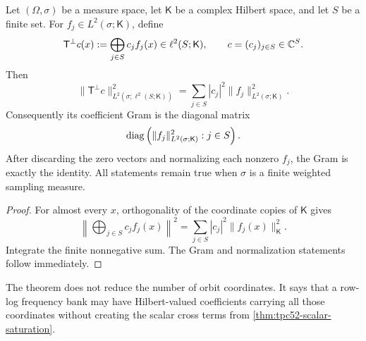\begin{theorem}
\label{thm:tpc52-orthogonal-lift}
Let \((\Omega,\sigma)\) be a measure space, let \(\mathsf K\) be a
complex Hilbert space, and let \(S\) be a finite set.  For
\(f_j\in L^2(\sigma;\mathsf K)\), define
\begin{equation}
 \mathsf T^\perp c(x)
 :=\bigoplus_{j\in S}c_jf_j(x)
 \in\ell^2(S;\mathsf K),
 \qquad c=(c_j)_{j\in S}\in\mathbb C^S.
 \label{eq:tpc52-orthogonal-lift-operator}
\end{equation}
Then
\begin{equation}
 \|\mathsf T^\perp c\|_{L^2(\sigma;\ell^2(S;\mathsf K))}^2
 =\sum_{j\in S}|c_j|^2
   \|f_j\|_{L^2(\sigma;\mathsf K)}^2.
 \label{eq:tpc52-orthogonal-lift-identity}
\end{equation}
Consequently its coefficient Gram is the diagonal matrix
\begin{equation}
 \operatorname{diag}\left(\|f_j\|_{L^2(\sigma;\mathsf K)}^2:j\in S\right).
 \label{eq:tpc52-orthogonal-lift-Gram}
\end{equation}
After discarding the zero vectors and normalizing each nonzero
\(f_j\), the Gram is exactly the identity.  All statements remain true
when \(\sigma\) is a finite weighted sampling measure.
\end{theorem}

\begin{proof}
For almost every \(x\), orthogonality of the coordinate copies of
\(\mathsf K\) gives
\begin{equation}
 \left\|\bigoplus_{j\in S}c_jf_j(x)\right\|^2
 =\sum_{j\in S}|c_j|^2\|f_j(x)\|_{\mathsf K}^2.
 \label{eq:tpc52-pointwise-orthogonal-lift}
\end{equation}
Integrate the finite nonnegative sum.  The Gram and normalization
statements follow immediately.
\end{proof}

The theorem does not reduce the number of orbit coordinates.  It says
that a row-log frequency bank may have Hilbert-valued coefficients
carrying all those coordinates without creating the scalar cross terms
from \cref{thm:tpc52-scalar-saturation}.

